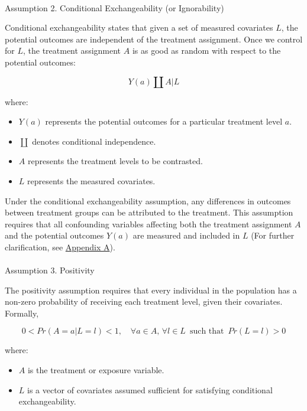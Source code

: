 \documentclass[
  single column]{article}
\makeatletter
\let\oldparagraph\paragraph
\renewcommand{\paragraph}{
    \@ifstar
      \xxxParagraphStar
      \xxxParagraphNoStar
  }
\newcommand{\xxxParagraphStar}[1]{\oldparagraph*{#1}\mbox{}}
\newcommand{\xxxParagraphNoStar}[1]{\oldparagraph{#1}\mbox{}}
\providecommand{\tightlist}{%
  \setlength{\itemsep}{0pt}\setlength{\parskip}{0pt}}\usepackage{longtable,booktabs,array}
\makeatother
\begin{document}
\paragraph{Assumption 2. Conditional Exchangeability (or
Ignorability)}\label{assumption-2.-conditional-exchangeability-or-ignorability}

Conditional exchangeability states that given a set of measured
covariates \(L\), the potential outcomes are independent of the
treatment assignment. Once we control for \(L\), the treatment
assignment \(A\) is as good as random with respect to the potential
outcomes:

\[
Y(a) \coprod A | L
\]

where:

\begin{itemize}
\tightlist
\item
  \(Y(a)\) represents the potential outcomes for a particular treatment
  level \(a\).
\item
  \(\coprod\) denotes conditional independence.
\item
  \(A\) represents the treatment levels to be contrasted.
\item
  \(L\) represents the measured covariates.
\end{itemize}

Under the conditional exchangeability assumption, any differences in
outcomes between treatment groups can be attributed to the treatment.
This assumption requires that all confounding variables affecting both
the treatment assignment \(A\) and the potential outcomes \(Y(a)\) are
measured and included in \(L\) (For further clarification, see
\hyperref[id-app-a]{Appendix A}).

\paragraph{Assumption 3. Positivity}\label{assumption-3.-positivity}

The positivity assumption requires that every individual in the
population has a non-zero probability of receiving each treatment level,
given their covariates. Formally,

\[
0 < Pr(A = a | L = l) < 1, \quad \forall a \in A, \, \forall l \in L \, \text{ such that } \, Pr(L = l) > 0
\]

where:

\begin{itemize}
\tightlist
\item
  \(A\) is the treatment or exposure variable.
\item
  \(L\) is a vector of covariates assumed sufficient for satisfying
  conditional exchangeability.
\end{itemize}
\end{document}
